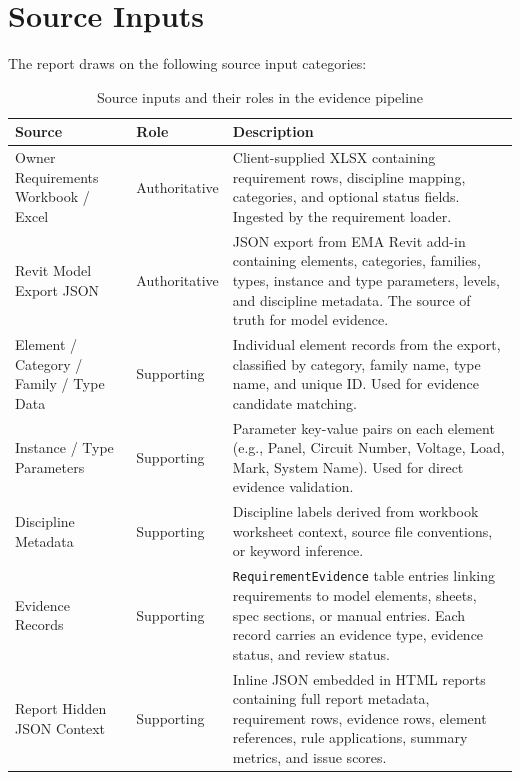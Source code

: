 \documentclass[10pt,letterpaper]{article}
\begin{document}
\section{Source Inputs}

The report draws on the following source input categories:

\begin{longtable}{p{1.5in}p{1.2in}p{3.8in}}
\caption{Source inputs and their roles in the evidence pipeline}
\label{tab:source-inputs}\\
\toprule
\textbf{Source} & \textbf{Role} & \textbf{Description} \\
\midrule
\endhead
Owner Requirements Workbook / Excel & Authoritative & Client-supplied XLSX containing requirement
  rows, discipline mapping, categories, and optional status fields. Ingested by the requirement
  loader. \\
\hline
Revit Model Export JSON & Authoritative & JSON export from EMA Revit add-in containing elements,
  categories, families, types, instance and type parameters, levels, and discipline metadata. The
  source of truth for model evidence. \\
\hline
Element / Category / Family / Type Data & Supporting & Individual element records from the export,
  classified by category, family name, type name, and unique ID. Used for evidence candidate
  matching. \\
\hline
Instance / Type Parameters & Supporting & Parameter key-value pairs on each element (e.g., Panel,
  Circuit Number, Voltage, Load, Mark, System Name). Used for direct evidence validation. \\
\hline
Discipline Metadata & Supporting & Discipline labels derived from workbook worksheet context, source
  file conventions, or keyword inference. \\
\hline
Evidence Records & Supporting & \texttt{RequirementEvidence} table entries linking requirements to
  model elements, sheets, spec sections, or manual entries. Each record carries an evidence type,
  evidence status, and review status. \\
\hline
Report Hidden JSON Context & Supporting & Inline JSON embedded in HTML reports containing full
  report metadata, requirement rows, evidence rows, element references, rule applications, summary
  metrics, and issue scores. \\
\bottomrule
\end{longtable}
\end{document}
